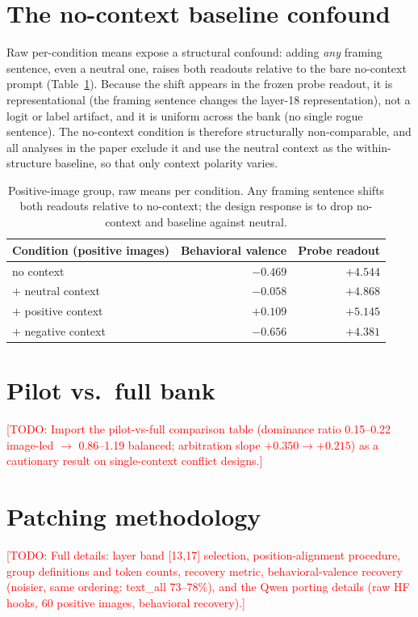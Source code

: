 \documentclass{article}
\newcommand{\todo}[1]{\textcolor{red}{[TODO: #1]}}
\begin{document}
\section{The no-context baseline confound}
\label{app:nocontext}

Raw per-condition means expose a structural confound: adding \emph{any} framing sentence, even a neutral one, raises both readouts relative to the bare no-context prompt (Table~\ref{tab:nocontext}). Because the shift appears in the frozen probe readout, it is representational (the framing sentence changes the layer-18 representation), not a logit or label artifact, and it is uniform across the bank (no single rogue sentence). The no-context condition is therefore structurally non-comparable, and all analyses in the paper exclude it and use the neutral context as the within-structure baseline, so that only context polarity varies.

\begin{table}[h]
  \caption{Positive-image group, raw means per condition. Any framing sentence shifts both readouts relative to no-context; the design response is to drop no-context and baseline against neutral.}
  \label{tab:nocontext}
  \centering
  \begin{tabular}{lrr}
    \toprule
    Condition (positive images) & Behavioral valence & Probe readout \\
    \midrule
    no context           & $-0.469$ & $+4.544$ \\
    $+$ neutral context  & $-0.058$ & $+4.868$ \\
    $+$ positive context & $+0.109$ & $+5.145$ \\
    $+$ negative context & $-0.656$ & $+4.381$ \\
    \bottomrule
  \end{tabular}
\end{table}

\section{Pilot vs.\ full bank}
\label{app:pilot}
\todo{Import the pilot-vs-full comparison table (dominance ratio 0.15--0.22 image-led $\to$ 0.86--1.19 balanced; arbitration slope $+0.350 \to +0.215$) as a cautionary result on single-context conflict designs.}

\section{Patching methodology}
\label{app:patching}
\todo{Full details: layer band [13,17] selection, position-alignment procedure, group definitions and token counts, recovery metric, behavioral-valence recovery (noisier, same ordering: text\_all 73--78\%), and the Qwen porting details (raw HF hooks, 60 positive images, behavioral recovery).}
\end{document}
